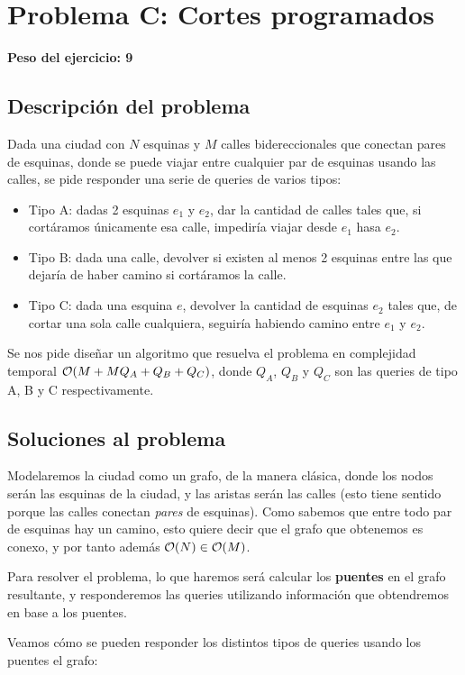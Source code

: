 \newpage{}
\section{Problema C: Cortes programados}
\textbf{Peso del ejercicio: 9}
\subsection{Descripción del problema}
Dada una ciudad con $N$ esquinas y $M$ calles bidereccionales que conectan 
pares de esquinas, donde se puede viajar entre cualquier par de esquinas 
usando las calles, se pide responder una serie de queries de varios tipos: 

\begin{itemize}
\item Tipo A: dadas 2 esquinas $e_1$ y $e_2$, dar la cantidad de calles tales que, 
si cortáramos únicamente esa calle, impediría viajar desde $e_1$ hasa $e_2$. 
\item Tipo B: dada una calle, devolver si existen al menos 2 esquinas entre las 
que dejaría de haber camino si cortáramos la calle. 
\item Tipo C: dada una esquina $e$, devolver la cantidad de esquinas $e_2$ tales que, 
de cortar una sola calle cualquiera, seguiría habiendo camino entre $e_1$ y $e_2$.
\end{itemize}

Se nos pide diseñar un algoritmo que resuelva el problema en complejidad temporal 
$\mathcal{O}(M + MQ_A + Q_B + Q_C)$, donde $Q_A$, $Q_B$ y $Q_C$ son las 
queries de tipo A, B y C respectivamente. 

\subsection{Soluciones al problema}
Modelaremos la ciudad como un grafo, de la manera clásica, donde los nodos 
serán las esquinas de la ciudad, y las aristas serán las calles (esto 
tiene sentido porque las calles conectan \textit{pares} de esquinas). 
Como sabemos que entre todo par de esquinas hay un camino, esto quiere 
decir que el grafo que obtenemos es conexo, y por tanto 
además $\mathcal{O}(N) \in \mathcal{O}(M)$.

Para resolver el problema, lo que haremos será calcular los \textbf{puentes} 
en el grafo resultante, y responderemos las queries utilizando información 
que obtendremos en base a los puentes. 

Veamos cómo se pueden responder los distintos tipos de queries usando 
los puentes el grafo: 

